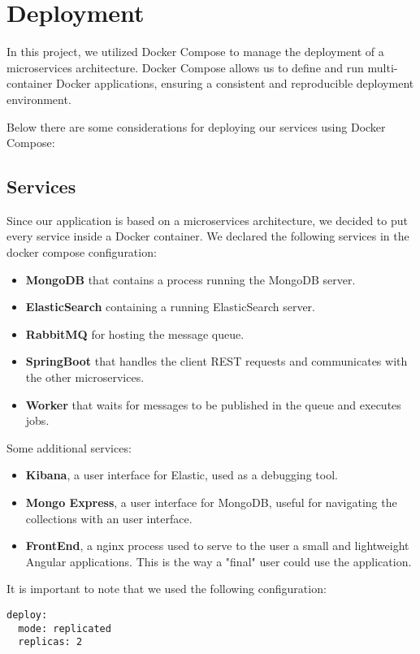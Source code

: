 \section{Deployment}
\label{ch:depl}

In this project, we utilized Docker Compose to manage the deployment of a
microservices architecture. Docker Compose allows us to define and run
multi-container Docker applications, ensuring a consistent and reproducible
deployment environment.

Below there are some considerations for
deploying our services using Docker Compose:

\subsection{Services}
Since our application is based on a microservices architecture, we decided
to put every service inside a Docker container.
We declared the following services in the docker compose configuration:
\begin{itemize}
        \item \textbf{MongoDB} that contains a process running the MongoDB server.
        \item \textbf{ElasticSearch} containing a running ElasticSearch server.
        \item \textbf{RabbitMQ} for hosting the message queue.
        \item \textbf{SpringBoot} that handles the client REST requests and
                communicates with the other microservices.
        \item \textbf{Worker} that waits for messages to be published in the
                queue and executes jobs.
\end{itemize}
Some additional services:
\begin{itemize}
        \item \textbf{Kibana}, a user interface for Elastic, used as a debugging
                tool.
        \item \textbf{Mongo Express}, a user interface for MongoDB, useful
                for navigating the collections with an user interface.
        \item \textbf{FrontEnd}, a nginx process used to serve to the user
                a small and lightweight Angular applications. This is the
                way a "final" user could use the application.
\end{itemize}

It is important to note that we used the following configuration:
\begin{lstlisting}[frame=single,caption=Replicas of a services,label=replicas]
deploy:
  mode: replicated
  replicas: 2
\end{lstlisting}

